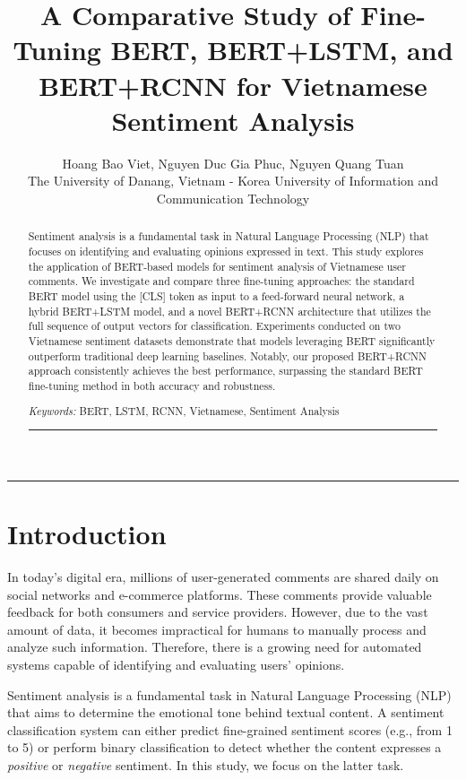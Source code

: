 \documentclass[11pt]{article}
\title{A Comparative Study of Fine-Tuning BERT, BERT+LSTM, and BERT+RCNN for Vietnamese Sentiment Analysis}
\author{
Hoang Bao Viet, 
Nguyen Duc Gia Phuc, 
Nguyen Quang Tuan \\
The University of Danang, Vietnam - Korea University of Information and Communication Technology
}
\date{}
\begin{document}
\maketitle

\noindent
\hrule
\begin{abstract}
Sentiment analysis is a fundamental task in Natural Language Processing (NLP) that focuses on identifying and evaluating opinions expressed in text. This study explores the application of BERT-based models for sentiment analysis of Vietnamese user comments. We investigate and compare three fine-tuning approaches: the standard BERT model using the [CLS] token as input to a feed-forward neural network, a hybrid BERT+LSTM model, and a novel BERT+RCNN architecture that utilizes the full sequence of output vectors for classification. Experiments conducted on two Vietnamese sentiment datasets demonstrate that models leveraging BERT significantly outperform traditional deep learning baselines. Notably, our proposed BERT+RCNN approach consistently achieves the best performance, surpassing the standard BERT fine-tuning method in both accuracy and robustness.

\vskip 8pt
\noindent
{\it Keywords:} BERT, LSTM, RCNN, Vietnamese, Sentiment Analysis
\vskip 8pt
\noindent
\hrule
\vskip 8pt
\end{abstract}


\vspace{-20pt}
\section{Introduction}

In today's digital era, millions of user-generated comments are shared daily on social networks and e-commerce platforms. These comments provide valuable feedback for both consumers and service providers. However, due to the vast amount of data, it becomes impractical for humans to manually process and analyze such information. Therefore, there is a growing need for automated systems capable of identifying and evaluating users' opinions.

Sentiment analysis is a fundamental task in Natural Language Processing (NLP) that aims to determine the emotional tone behind textual content. A sentiment classification system can either predict fine-grained sentiment scores (e.g., from 1 to 5) or perform binary classification to detect whether the content expresses a \textit{positive} or \textit{negative} sentiment. In this study, we focus on the latter task.
\end{document}
